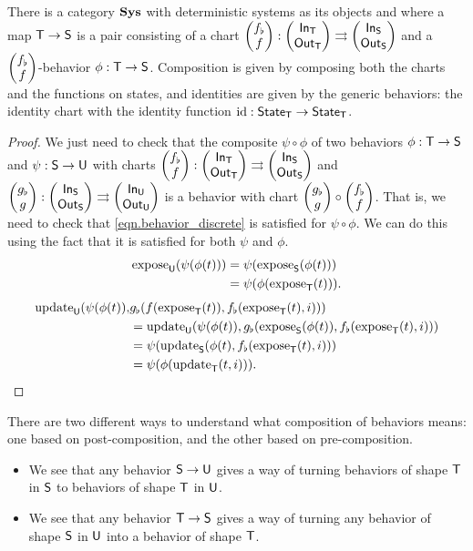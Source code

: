 \documentclass[DynamicalBook]{subfiles}
\begin{document}
{\begin{proposition}
  There is a category $\textbf{Sys}$ with deterministic systems as its objects and
  where a map $\mathsf{T} \to \mathsf{S}$ is a pair consisting of a chart
  $\begin{pmatrix}{f_{\flat}} \\ {f} \end{pmatrix} : \begin{pmatrix}{\mathsf{In}_{\mathsf{T}}} \\ {\mathsf{Out}_{\mathsf{T}}} \end{pmatrix} \rightrightarrows
  \begin{pmatrix}{\mathsf{In}_{\mathsf{S}}} \\ {\mathsf{Out}_{\mathsf{S}}} \end{pmatrix}$ and a $\begin{pmatrix}{f_{\flat}} \\ {f} \end{pmatrix}$-behavior $\phi : \mathsf{T}
  \to \mathsf{S}$. Composition is given by composing both the charts and the
  functions on states, and identities are given by the generic behaviors: the identity chart with the
  identity function $\mathrm{id} : \mathsf{State}_{\mathsf{T}} \to \mathsf{State}_{\mathsf{T}}$.
\end{proposition}
\begin{proof}
  We just need to check that the composite $\psi \circ \phi$ of two behaviors $\phi : \mathsf{T} \to
  \mathsf{S}$ and $\psi : \mathsf{S} \to \mathsf{U}$ with charts $\begin{pmatrix}{f_{\flat}} \\ {f} \end{pmatrix} : \begin{pmatrix}{\mathsf{In}_{\mathsf{T}}} \\ {\mathsf{Out}_{\mathsf{T}}} \end{pmatrix} \rightrightarrows
  \begin{pmatrix}{\mathsf{In}_{\mathsf{S}}} \\ {\mathsf{Out}_{\mathsf{S}}} \end{pmatrix}$ and $\begin{pmatrix}{g_{\flat}} \\ {g} \end{pmatrix} : \begin{pmatrix}{\mathsf{In}_{\mathsf{S}}} \\ {\mathsf{Out}_{\mathsf{S}}} \end{pmatrix} \rightrightarrows
  \begin{pmatrix}{\mathsf{In}_{\mathsf{U}}} \\ {\mathsf{Out}_{\mathsf{U}}} \end{pmatrix}$ is a behavior with chart $\begin{pmatrix}{g_{\flat}} \\ {g} \end{pmatrix} \circ
  \begin{pmatrix}{f_{\flat}} \\ {f} \end{pmatrix}$. That is, we need to check that
  \cref{eqn.behavior_discrete} is satisfied for $\psi \circ \phi$. We can do
  this using the fact that it is satisfied for both $\psi$ and $\phi$.
  \begin{align*}
    \mathrm{expose}_{\mathsf{U}}(\psi(\phi(t))) &= \psi(\mathrm{expose}_{\mathsf{S}}(\phi(t))) \\
                              &= \psi(\phi(\mathrm{expose}_{\mathsf{T}}(t))).\\
  \end{align*}
  \begin{align*}
    \mathrm{update}_{\mathsf{U}}(\psi(\phi(t)), &g_{\flat}(f(\mathrm{expose}_{\mathsf{T}}(t)), f_{\flat}(\mathrm{expose}_{\mathsf{T}}(t), i)))  \\
                              &=\mathrm{update}_{\mathsf{U}}(\psi(\phi(t)), g_{\flat}(\mathrm{expose}_{\mathsf{S}}(\phi(t)), f_{\flat}(\mathrm{expose}_{\mathsf{T}}(t), i))) \\
                              &= \psi(\mathrm{update}_{\mathsf{S}}(\phi(t), f_{\flat}(\mathrm{expose}_{\mathsf{T}}(t), i))) \\
    &= \psi(\phi(\mathrm{update}_{\mathsf{T}}(t, i))).
  \end{align*}
\end{proof}

There are two different ways to understand what composition of behaviors means:
one based on post-composition, and the other based on pre-composition.
\begin{itemize}
  \item We see that any behavior $\mathsf{S} \to \mathsf{U}$ gives a way of turning
    behaviors of shape $\mathsf{T}$ in $\mathsf{S}$ to behaviors of shape $\mathsf{T}$ in $\mathsf{U}$.
  \item We see that any behavior $\mathsf{T} \to \mathsf{S}$ gives a way of turning
    any behavior of shape $\mathsf{S}$ in $\mathsf{U}$ into a behavior of shape $\mathsf{T}$.
\end{itemize}

}
\end{document}
